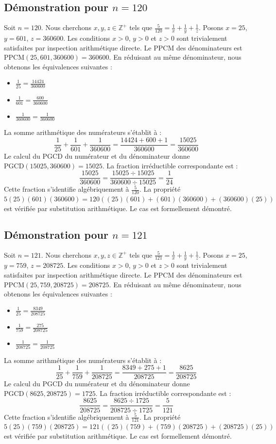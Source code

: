\documentclass[12pt,a4paper]{article}
\begin{document}
\subsection{Démonstration pour $n = 120$}
Soit $n = 120$. Nous cherchons $x, y, z \in \mathbb{Z}^{+}$ tels que $\frac{5}{120} = \frac{1}{x} + \frac{1}{y} + \frac{1}{z}$.
Posons $x = 25$, $y = 601$, $z = 360600$.
Les conditions $x > 0$, $y > 0$ et $z > 0$ sont trivialement satisfaites par inspection arithmétique directe.
Le PPCM des dénominateurs est $\text{PPCM}(25, 601, 360600) = 360600$.
En réduisant au même dénominateur, nous obtenons les équivalences suivantes :
\begin{itemize}
    \item $\frac{1}{25} = \frac{14424}{360600}$
    \item $\frac{1}{601} = \frac{600}{360600}$
    \item $\frac{1}{360600} = \frac{1}{360600}$
\end{itemize}
La somme arithmétique des numérateurs s'établit à :
$$ \frac{1}{25} + \frac{1}{601} + \frac{1}{360600} = \frac{14424 + 600 + 1}{360600} = \frac{15025}{360600} $$
Le calcul du PGCD du numérateur et du dénominateur donne $\text{PGCD}(15025, 360600) = 15025$.
La fraction irréductible correspondante est :
$$ \frac{15025}{360600} = \frac{15025 \div 15025}{360600 \div 15025} = \frac{1}{24} $$
Cette fraction s'identifie algébriquement à $\frac{5}{120}$.
La propriété $5(25)(601)(360600) = 120((25)(601) + (601)(360600) + (360600)(25))$ est vérifiée par substitution arithmétique.
Le cas est formellement démontré.

\subsection{Démonstration pour $n = 121$}
Soit $n = 121$. Nous cherchons $x, y, z \in \mathbb{Z}^{+}$ tels que $\frac{5}{121} = \frac{1}{x} + \frac{1}{y} + \frac{1}{z}$.
Posons $x = 25$, $y = 759$, $z = 208725$.
Les conditions $x > 0$, $y > 0$ et $z > 0$ sont trivialement satisfaites par inspection arithmétique directe.
Le PPCM des dénominateurs est $\text{PPCM}(25, 759, 208725) = 208725$.
En réduisant au même dénominateur, nous obtenons les équivalences suivantes :
\begin{itemize}
    \item $\frac{1}{25} = \frac{8349}{208725}$
    \item $\frac{1}{759} = \frac{275}{208725}$
    \item $\frac{1}{208725} = \frac{1}{208725}$
\end{itemize}
La somme arithmétique des numérateurs s'établit à :
$$ \frac{1}{25} + \frac{1}{759} + \frac{1}{208725} = \frac{8349 + 275 + 1}{208725} = \frac{8625}{208725} $$
Le calcul du PGCD du numérateur et du dénominateur donne $\text{PGCD}(8625, 208725) = 1725$.
La fraction irréductible correspondante est :
$$ \frac{8625}{208725} = \frac{8625 \div 1725}{208725 \div 1725} = \frac{5}{121} $$
Cette fraction s'identifie algébriquement à $\frac{5}{121}$.
La propriété $5(25)(759)(208725) = 121((25)(759) + (759)(208725) + (208725)(25))$ est vérifiée par substitution arithmétique.
Le cas est formellement démontré.
\end{document}
